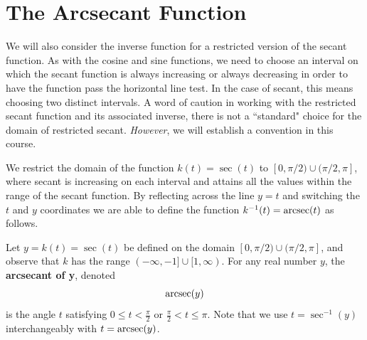 \documentclass{ximera}
\begin{document}
\section{The Arcsecant Function}
%
We will also consider the inverse function for a restricted version of the secant function. 
As with the cosine and sine functions, we need to choose an interval on which the secant function is always increasing or always decreasing in order to have the function pass the horizontal line test. In the case of secant, this means choosing two distinct intervals. A word of caution in working with the restricted secant function and its associated inverse, there is not a ``standard" choice for the domain of restricted secant. {\it However}, we will establish a convention in this course. 

We restrict the domain of the function $k(t) = \sec(t)$ to $[0,\pi/2) \cup (\pi/2,\pi ]$, where secant is increasing on each interval and attains all the values within the range of the secant function. By reflecting across the line $y=t$ and switching the $t$ and $y$ coordinates we are able to define the function $k^{-1}(t)=\operatorname{arcsec}(t)$ as follows.

\begin{definition}
Let $y = k(t) = \sec(t)$ be defined on the domain $[0,\pi/2) \cup (\pi/2,\pi ]$, and observe that $k$ has the range $(-\infty,-1] \cup [1,\infty)$. 
For any real number $y$, the {\bf arcsecant of y}, denoted
$$\operatorname{arcsec}(y)$$
is the angle $t$ satisfying $0 \leq t < \frac{\pi}{2}$ or $\frac{\pi}{2} < t \leq \pi$. Note that we use $t = \sec^{-1}(y)$ interchangeably with $t = \operatorname{arcsec}(y)$.
\end{definition}
\end{document}
